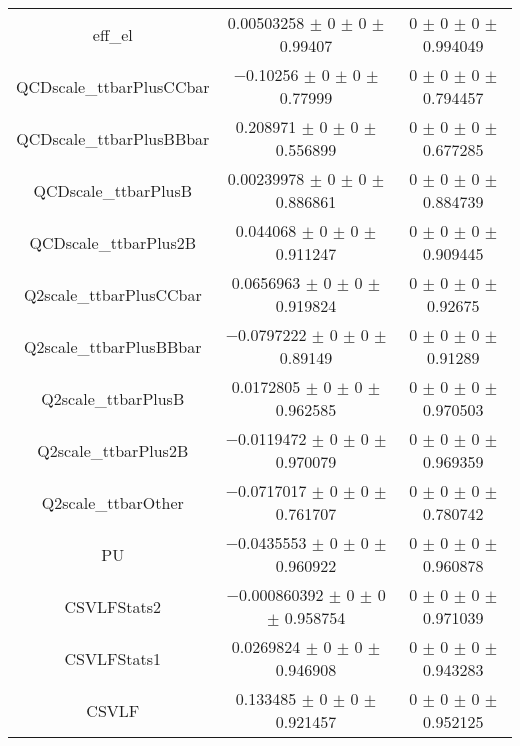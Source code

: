 \begin{table}
\begin{tabular}{ccc}
eff\_el 	& \num{0.00503258} $\pm$ \num{0} $\pm$ \num{0} $\pm$ \num{0.99407} 	& \num{0} $\pm$ \num{0} $\pm$ \num{0} $\pm$ \num{0.994049}\\
QCDscale\_ttbarPlusCCbar 	& \num{-0.10256} $\pm$ \num{0} $\pm$ \num{0} $\pm$ \num{0.77999} 	& \num{0} $\pm$ \num{0} $\pm$ \num{0} $\pm$ \num{0.794457}\\
QCDscale\_ttbarPlusBBbar 	& \num{0.208971} $\pm$ \num{0} $\pm$ \num{0} $\pm$ \num{0.556899} 	& \num{0} $\pm$ \num{0} $\pm$ \num{0} $\pm$ \num{0.677285}\\
QCDscale\_ttbarPlusB 	& \num{0.00239978} $\pm$ \num{0} $\pm$ \num{0} $\pm$ \num{0.886861} 	& \num{0} $\pm$ \num{0} $\pm$ \num{0} $\pm$ \num{0.884739}\\
QCDscale\_ttbarPlus2B 	& \num{0.044068} $\pm$ \num{0} $\pm$ \num{0} $\pm$ \num{0.911247} 	& \num{0} $\pm$ \num{0} $\pm$ \num{0} $\pm$ \num{0.909445}\\
Q2scale\_ttbarPlusCCbar 	& \num{0.0656963} $\pm$ \num{0} $\pm$ \num{0} $\pm$ \num{0.919824} 	& \num{0} $\pm$ \num{0} $\pm$ \num{0} $\pm$ \num{0.92675}\\
Q2scale\_ttbarPlusBBbar 	& \num{-0.0797222} $\pm$ \num{0} $\pm$ \num{0} $\pm$ \num{0.89149} 	& \num{0} $\pm$ \num{0} $\pm$ \num{0} $\pm$ \num{0.91289}\\
Q2scale\_ttbarPlusB 	& \num{0.0172805} $\pm$ \num{0} $\pm$ \num{0} $\pm$ \num{0.962585} 	& \num{0} $\pm$ \num{0} $\pm$ \num{0} $\pm$ \num{0.970503}\\
Q2scale\_ttbarPlus2B 	& \num{-0.0119472} $\pm$ \num{0} $\pm$ \num{0} $\pm$ \num{0.970079} 	& \num{0} $\pm$ \num{0} $\pm$ \num{0} $\pm$ \num{0.969359}\\
Q2scale\_ttbarOther 	& \num{-0.0717017} $\pm$ \num{0} $\pm$ \num{0} $\pm$ \num{0.761707} 	& \num{0} $\pm$ \num{0} $\pm$ \num{0} $\pm$ \num{0.780742}\\
PU 	& \num{-0.0435553} $\pm$ \num{0} $\pm$ \num{0} $\pm$ \num{0.960922} 	& \num{0} $\pm$ \num{0} $\pm$ \num{0} $\pm$ \num{0.960878}\\
CSVLFStats2 	& \num{-0.000860392} $\pm$ \num{0} $\pm$ \num{0} $\pm$ \num{0.958754} 	& \num{0} $\pm$ \num{0} $\pm$ \num{0} $\pm$ \num{0.971039}\\
CSVLFStats1 	& \num{0.0269824} $\pm$ \num{0} $\pm$ \num{0} $\pm$ \num{0.946908} 	& \num{0} $\pm$ \num{0} $\pm$ \num{0} $\pm$ \num{0.943283}\\
CSVLF 	& \num{0.133485} $\pm$ \num{0} $\pm$ \num{0} $\pm$ \num{0.921457} 	& \num{0} $\pm$ \num{0} $\pm$ \num{0} $\pm$ \num{0.952125}\\

\end{tabular}
\end{table}
